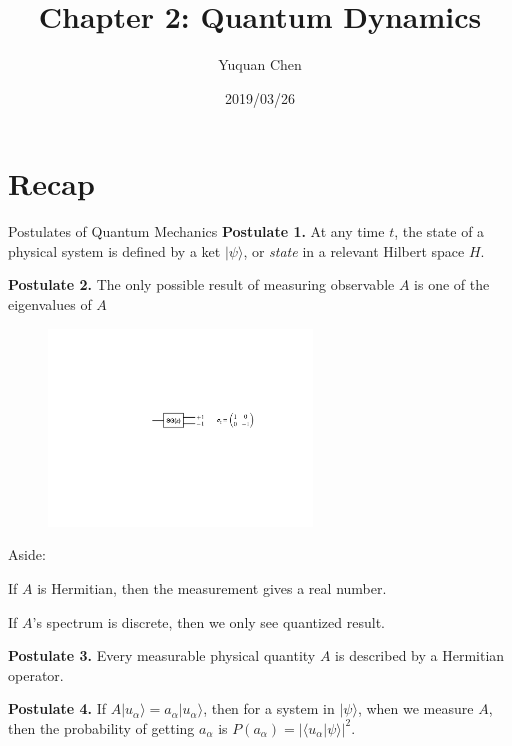\documentclass[UTF8,12pt]{article} %
\begin{document}
\title{Chapter 2: Quantum Dynamics}
\author{Yuquan Chen}
\date{2019/03/26} %
\maketitle

\section{Recap}

\begin{myboxes}{Postulates of Quantum Mechanics}{}
\textbf{Postulate 1.} At any time $t$, the state of a physical system is defined by a ket $|\psi\rangle$, or \textit{state} in a relevant Hilbert space $H$.\\\par
\textbf{Postulate 2.} The only possible result of measuring observable $A$ is one of the eigenvalues of $A$
\begin{figure}[H]
\begin{center}
\includegraphics[width=7cm]{post2}
\end{center}
\end{figure}
Aside:
\begin{enumerate*}
\item If $A$ is Hermitian, then the measurement gives a real number.
\item If $A$'s spectrum is discrete, then we only see quantized result.
\end{enumerate*}
\textbf{Postulate 3.} Every measurable physical quantity $A$ is described by a Hermitian operator.\\\par
\textbf{Postulate 4.} If $A|u_{\alpha}\rangle = a_{\alpha}|u_{\alpha}\rangle$, then for a system in $|\psi\rangle$, when we measure $A$, then the probability of getting $a_{\alpha}$ is $P(a_{\alpha}) = |\langle u_{\alpha}|\psi\rangle|^{2}$.\\

\end{myboxes}
\end{document}
